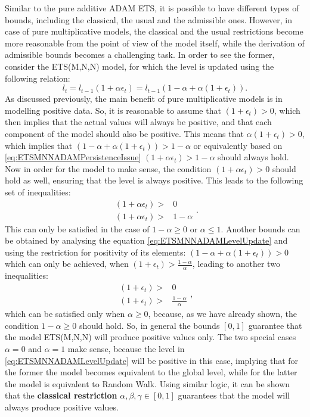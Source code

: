 \documentclass[
]{book}
\theoremstyle{definition}
\theoremstyle{definition}
\theoremstyle{definition}
\theoremstyle{definition}
\theoremstyle{remark}
\begin{document}
Similar to the pure additive ADAM ETS, it is possible to have different types of bounds, including the classical, the usual and the admissible ones. However, in case of pure multiplicative models, the classical and the usual restrictions become more reasonable from the point of view of the model itself, while the derivation of admissible bounds becomes a challenging task. In order to see the former, consider the ETS(M,N,N) model, for which the level is updated using the following relation:
\begin{equation}
    l_t = l_{t-1} (1 + \alpha\epsilon_t) = l_{t-1} (1-\alpha + \alpha(1+\epsilon_t)).
  \label{eq:ETSMNNADAMLevelUpdate}
\end{equation}
As discussed previously, the main benefit of pure multiplicative models is in modelling positive data. So, it is reasonable to assume that \((1 + \epsilon_t)>0\), which then implies that the actual values will always be positive, and that each component of the model should also be positive. This means that \(\alpha(1 + \epsilon_t)>0\), which implies that \((1-\alpha + \alpha(1+\epsilon_t))>1-\alpha\) or equivalently based on \eqref{eq:ETSMNNADAMPersistenceIssue} \((1 + \alpha\epsilon_t)>1-\alpha\) should always hold. Now in order for the model to make sense, the condition \((1 + \alpha\epsilon_t)>0\) should hold as well, ensuring that the level is always positive. This leads to the following set of inequalities:
\begin{equation}
    \begin{aligned}
    (1 + \alpha\epsilon_t)> &0 \\
    (1 + \alpha\epsilon_t)> &1-\alpha
    \end{aligned} .
    \label{eq:ETSMNNADAMInequalities01}
\end{equation}
This can only be satisfied in the case of \(1-\alpha\geq0\) or \(\alpha\leq1\). Another bounds can be obtained by analysing the equation \eqref{eq:ETSMNNADAMLevelUpdate} and using the restriction for positivity of its elements: \((1-\alpha + \alpha(1+\epsilon_t))>0\) which can only be achieved, when \((1+\epsilon_t)>\frac{1-\alpha}{\alpha}\), leading to another two inequalities:
\begin{equation}
    \begin{aligned}
    (1 + \epsilon_t)> &0 \\
    (1 + \epsilon_t)> &\frac{1-\alpha}{\alpha}
    \end{aligned} ,
    \label{eq:ETSMNNADAMInequalities02}
\end{equation}
which can be satisfied only when \(\alpha\geq0\), because, as we have already shown, the condition \(1-\alpha\geq0\) should hold. So, in general the bounds \([0, 1]\) guarantee that the model ETS(M,N,N) will produce positive values only. The two special cases \(\alpha=0\) and \(\alpha=1\) make sense, because the level in \eqref{eq:ETSMNNADAMLevelUpdate} will be positive in this case, implying that for the former the model becomes equivalent to the global level, while for the latter the model is equivalent to Random Walk. Using similar logic, it can be shown that the \textbf{classical restriction} \(\alpha, \beta, \gamma \in [0, 1]\) guarantees that the model will always produce positive values.
\end{document}
